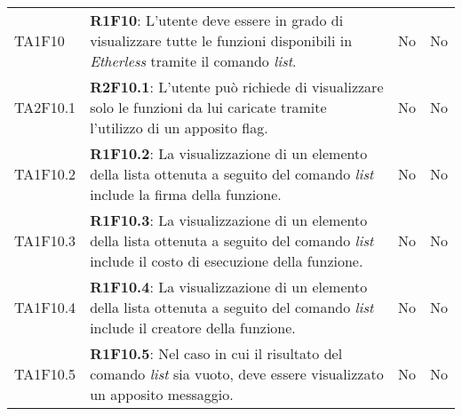 \begin{longtable}{ 
		>{\centering}p{} 
		>{}p{} 
		>{\centering}p{}
		>{\centering}p{} }
	TA1F10 & \textbf{R1F10}: L'utente deve essere in grado di visualizzare tutte le funzioni 
		disponibili in \textit{Etherless} tramite il comando \textit{list}. 		& No & No \tabularnewline
	TA2F10.1 & \textbf{R2F10.1}: L'utente può richiede di visualizzare solo le funzioni da 
		lui caricate tramite l'utilizzo di un apposito flag. 						& No & No \tabularnewline
	TA1F10.2 & \textbf{R1F10.2}: La visualizzazione di un elemento della lista ottenuta a seguito 
		del comando \textit{list} include la firma della funzione. 					& No & No \tabularnewline
	TA1F10.3 & \textbf{R1F10.3}: La visualizzazione di un elemento della lista ottenuta a seguito 
		del comando \textit{list} include il costo di esecuzione della funzione. 	& No & No \tabularnewline
	TA1F10.4 & \textbf{R1F10.4}: La visualizzazione di un elemento della lista ottenuta a seguito 
		del comando \textit{list} include il creatore della funzione. 				& No & No \tabularnewline
	TA1F10.5 & \textbf{R1F10.5}: Nel caso in cui il risultato del comando \textit{list} sia vuoto, deve 
		essere visualizzato un apposito messaggio. 									& No & No \tabularnewline
	

\end{longtable}

